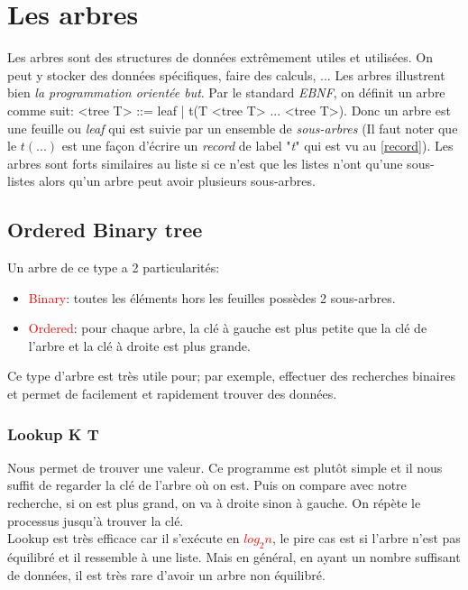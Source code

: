 \documentclass{report}
\begin{document}
\section{Les arbres}
Les arbres sont des structures de données extrêmement utiles et utilisées. On peut y stocker des données spécifiques, faire des calculs, ... Les arbres illustrent bien \textit{la programmation orientée but}. Par le standard \textit{EBNF}, on définit un arbre comme suit: <tree T> ::= leaf | t(T <tree T> ... <tree T>). Donc un arbre est une feuille ou \textit{leaf} qui est suivie par un ensemble de \textit{sous-arbres} (Il faut noter que le $t(...)$ est une façon d'écrire un \textit{record} de label "\textit{t}" qui est vu au \ref{record}). Les arbres sont forts similaires au liste si ce n'est que les listes n'ont qu'une sous-listes alors qu'un arbre peut avoir plusieurs sous-arbres.

\subsection{Ordered Binary tree}
Un arbre de ce type a 2 particularités:
\begin{itemize}
\item \textcolor{red}{Binary}: toutes les éléments hors les feuilles possèdes 2 sous-arbres.
\item \textcolor{red}{Ordered}: pour chaque arbre, la clé à gauche est plus petite que la clé de l'arbre et la clé à droite est plus grande.
\end{itemize}
Ce type d'arbre est très utile pour; par exemple, effectuer des recherches binaires et permet de facilement et rapidement trouver des données.

\subsubsection{Lookup K T}
Nous permet de trouver une valeur. Ce programme est plutôt simple et il nous suffit de regarder la clé de l'arbre où on est. Puis on compare avec notre recherche, si on est plus grand, on va à droite sinon à gauche. On répète le processus jusqu'à trouver la clé.\\
Lookup est très efficace car il s'exécute en \textcolor{red}{$log_2 n$}, le pire cas est si l'arbre n'est pas équilibré et il ressemble à une liste. Mais en général, en ayant un nombre suffisant de données, il est très rare d'avoir un arbre non équilibré.
\end{document}
